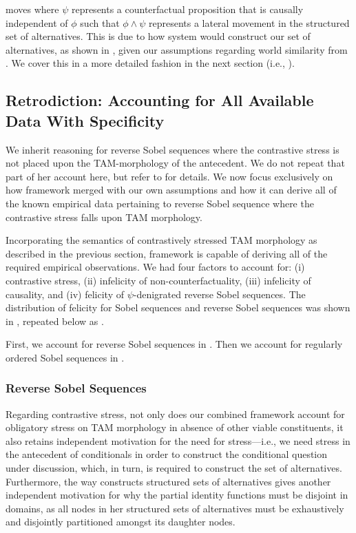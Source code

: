 moves where $\psi$ represents a counterfactual proposition that is causally independent of $\phi$ such that $\phi\land\psi$ represents a lateral movement in the structured set of alternatives. This is due to how  system would construct our set of alternatives, as shown in , given our assumptions regarding world similarity from . We cover this in a more detailed fashion in the next section (i.e., ).

\subsection{Retrodiction: Accounting for All Available Data With Specificity}
We inherit  reasoning for reverse Sobel sequences where the contrastive stress is not placed upon the TAM-morphology of the antecedent. We do not repeat that part of her account here, but refer to  for details. We now focus exclusively on how  framework merged with our own assumptions and how it can derive all of the known empirical data pertaining to reverse Sobel sequence where the contrastive stress falls upon TAM morphology. 

Incorporating the semantics of contrastively stressed TAM morphology as described in the previous section,  framework is capable of deriving all of the required empirical observations. We had four factors to account for: (i) contrastive stress, (ii) infelicity of non-counterfactuality, (iii) infelicity of causality, and (iv) felicity of $\psi$-denigrated reverse Sobel sequences. The distribution of felicity for Sobel sequences and reverse Sobel sequences was shown in , repeated below as .
\begin{table}[!htb]
\end{table}

\noindent First, we account for reverse Sobel sequences in . Then we account for regularly ordered Sobel sequences in .

\subsubsection{Reverse Sobel Sequences}
Regarding contrastive stress, not only does our combined framework account for obligatory stress on TAM morphology in absence of other viable constituents, it also retains  independent motivation for the need for stress---i.e., we need stress in the antecedent of conditionals in order to construct the conditional question under discussion, which, in turn, is required to construct the set of alternatives. Furthermore, the way \textcite{Ippolito2020} constructs structured sets of alternatives gives another independent motivation for why the partial identity functions must be disjoint in domains, as all nodes in her structured sets of alternatives must be exhaustively and disjointly partitioned amongst its daughter nodes.

